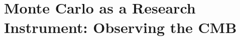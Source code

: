 \chapter{Monte Carlo as a Research Instrument: Observing the CMB}\label{ch:08}
\providecommand{\EightANside}{}\renewcommand{\EightANside}{256}
\providecommand{\EightANpix}{}\renewcommand{\EightANpix}{786432}
\providecommand{\EightAPixSide}{}\renewcommand{\EightAPixSide}{13.7}
\providecommand{\EightAOmegaPix}{}\renewcommand{\EightAOmegaPix}{1.598\times10^{-5}}
\providecommand{\EightAFwhm}{}\renewcommand{\EightAFwhm}{30}
\providecommand{\EightASigmaBeam}{}\renewcommand{\EightASigmaBeam}{12.7}
\providecommand{\EightADepth}{}\renewcommand{\EightADepth}{200}
\providecommand{\EightASigmaPix}{}\renewcommand{\EightASigmaPix}{14.6}
\providecommand{\EightANell}{}\renewcommand{\EightANell}{3.38\times10^{-3}}
\providecommand{\EightALmax}{}\renewcommand{\EightALmax}{512}
\providecommand{\EightALmaxSim}{}\renewcommand{\EightALmaxSim}{767}
\providecommand{\EightARmsSky}{}\renewcommand{\EightARmsSky}{108}
\providecommand{\EightARmsBeamed}{}\renewcommand{\EightARmsBeamed}{86}
\providecommand{\EightARmsNoise}{}\renewcommand{\EightARmsNoise}{14.6}
\providecommand{\EightARmsObs}{}\renewcommand{\EightARmsObs}{88}
\providecommand{\EightABeamMaxDev}{}\renewcommand{\EightABeamMaxDev}{8\times10^{-7}}
\providecommand{\EightABeamHpDev}{}\renewcommand{\EightABeamHpDev}{0}
\providecommand{\EightABeamDevFive}{}\renewcommand{\EightABeamDevFive}{0.2}
\providecommand{\EightABeamDevTen}{}\renewcommand{\EightABeamDevTen}{0.6}
\providecommand{\EightALHalf}{}\renewcommand{\EightALHalf}{224}
\providecommand{\EightALHalfFormula}{}\renewcommand{\EightALHalfFormula}{225}
\providecommand{\EightABlmax}{}\renewcommand{\EightABlmax}{0.165}
\providecommand{\EightAPlmax}{}\renewcommand{\EightAPlmax}{0.827}
\providecommand{\EightAPlTwoFiveSix}{}\renewcommand{\EightAPlTwoFiveSix}{0.954}
\providecommand{\EightATlmaxSq}{}\renewcommand{\EightATlmaxSq}{0.0186}
\providecommand{\EightACholSix}{}\renewcommand{\EightACholSix}{0.80}
\providecommand{\EightALikeDaysTwoFiveSix}{}\renewcommand{\EightALikeDaysTwoFiveSix}{21}
\providecommand{\EightALikeYrFiveTwelve}{}\renewcommand{\EightALikeYrFiveTwelve}{4}
\providecommand{\EightALikeYrPlanck}{}\renewcommand{\EightALikeYrPlanck}{1.5\times10^{4}}
\providecommand{\EightAShtTwoFiveSix}{}\renewcommand{\EightAShtTwoFiveSix}{0.02}
\providecommand{\EightAShtPlanck}{}\renewcommand{\EightAShtPlanck}{9}
\providecommand{\EightAMemTwoFiveSix}{}\renewcommand{\EightAMemTwoFiveSix}{4.9}
\providecommand{\EightAMemPlanck}{}\renewcommand{\EightAMemPlanck}{20266}
